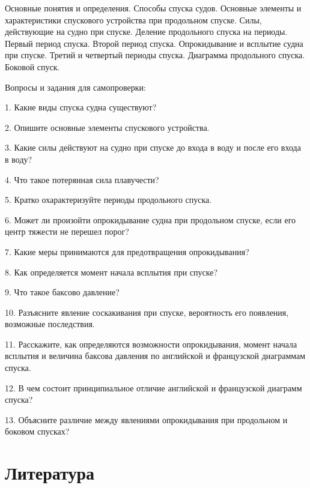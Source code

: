 Основные понятия и определения.
Способы спуска судов. Основные элементы и характеристики спускового устройства при продольном спуске.
Силы, действующие на судно при спуске.
Деление продольного спуска на периоды.
Первый период спуска.
Второй период спуска.
Опрокидывание и всплытие судна при спуске.
Третий и четвертый периоды спуска.
Диаграмма продольного спуска.
Боковой спуск.

\vspace{0.5cm}

Вопросы и задания для самопроверки:

1.	Какие виды спуска судна существуют?

2.	Опишите основные элементы спускового устройства.

3.	Какие силы действуют на судно при спуске до входа в воду и после его входа в воду?

4.	Что такое потерянная сила плавучести?

5.	Кратко охарактеризуйте периоды продольного спуска.

6.	Может ли произойти опрокидывание судна при продольном спуске, если его центр тяжести не перешел порог?

7.	Какие меры принимаются для предотвращения опрокидывания?

8.	Как определяется момент начала всплытия при спуске?

9.	Что такое баксово давление?

10.	Разъясните явление соскакивания при спуске, вероятность его появления, возможные последствия.

11.	Расскажите, как определяются возможности опрокидывания, момент начала всплытия и величина баксова давления по английской и французской диаграммам спуска.

12.	В чем состоит принципиальное отличие английской и французской диаграмм спуска?

13.	Объясните различие между явлениями опрокидывания при продольном и боковом спусках?


\section{Литература}

